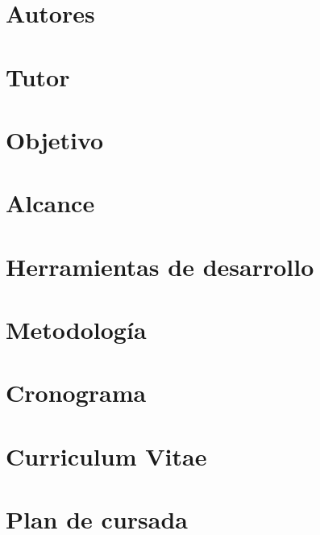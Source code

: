 \documentclass[a4paper,11pt]{article}
\begin{document}
\tableofcontents
\clearpage

\section{Autores}

\section{Tutor}

\section{Objetivo}

\section{Alcance}

\section{Herramientas de desarrollo}

\section{Metodología}

\section{Cronograma}

\section{Curriculum Vitae}

\section{Plan de cursada}
\end{document}
